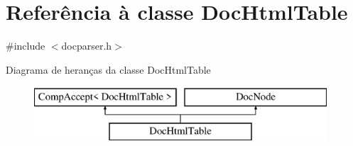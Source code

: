 \hypertarget{class_doc_html_table}{\section{Referência à classe Doc\-Html\-Table}
\label{class_doc_html_table}
}


{\ttfamily \#include $<$docparser.\-h$>$}

Diagrama de heranças da classe Doc\-Html\-Table\begin{figure}[H]
\begin{center}
\leavevmode
\includegraphics[height=2.000000cm]{class_doc_html_table}
\end{center}
\end{figure}
